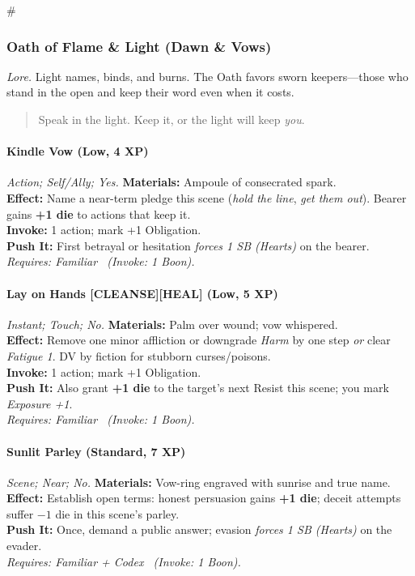 # %

\subsubsection{Oath of Flame \& Light (Dawn \& Vows)}
\textit{Lore.} Light names, binds, and burns. The Oath favors sworn keepers—those who stand in the open and keep their word even when it costs.

\begin{quote}
Speak in the light. Keep it, or the light will keep \emph{you}.
\end{quote}

\paragraph*{Kindle Vow (Low, 4 XP)} \emph{Action; Self/Ally; Yes.}
\textbf{Materials:} Ampoule of consecrated spark.\\
\textbf{Effect:} Name a near-term pledge this scene (\emph{hold the line}, \emph{get them out}). Bearer gains \textbf{+1 die} to actions that keep it.\\
\textbf{Invoke:} 1 action; mark +1 Obligation.\\
\textbf{Push It:} First betrayal or hesitation \emph{forces 1 SB (Hearts)} on the bearer.\\
\emph{Requires: Familiar \ (\textit{Invoke:} 1 Boon).}

\paragraph*{Lay on Hands \textnormal{[CLEANSE][HEAL]} (Low, 5 XP)} \emph{Instant; Touch; No.}
\textbf{Materials:} Palm over wound; vow whispered.\\
\textbf{Effect:} Remove one minor affliction or downgrade \emph{Harm} by one step \emph{or} clear \emph{Fatigue 1}. DV by fiction for stubborn curses/poisons.\\
\textbf{Invoke:} 1 action; mark +1 Obligation.\\
\textbf{Push It:} Also grant \textbf{+1 die} to the target's next Resist this scene; you mark \emph{Exposure +1}.\\
\emph{Requires: Familiar \ (\textit{Invoke:} 1 Boon).}

\paragraph{Sunlit Parley (Standard, 7 XP)} \emph{Scene; Near; No.}
\textbf{Materials:} Vow-ring engraved with sunrise and true name.\\
\textbf{Effect:} Establish open terms: honest persuasion gains \textbf{+1 die}; deceit attempts suffer \(-1\) die in this scene's parley.\\
\textbf{Push It:} Once, demand a public answer; evasion \emph{forces 1 SB (Hearts)} on the evader.\\
\emph{Requires: Familiar + Codex \ (\textit{Invoke:} 1 Boon).}

